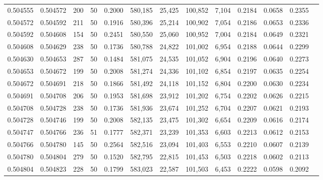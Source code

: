 \begin{tabular}{rrrrrrrrrrrrr}
0.504555 & 0.504572 & 200 &  50 &                                     0.2000 & 580,185 &  25,425 & 100,852 &   7,104 & 0.2184 & 0.0658 & 0.2355 \\
0.504572 & 0.504592 & 211 &  50 &                                     0.1916 & 580,396 &  25,214 & 100,902 &   7,054 & 0.2186 & 0.0653 & 0.2336 \\
0.504592 & 0.504608 & 154 &  50 &                                     0.2451 & 580,550 &  25,060 & 100,952 &   7,004 & 0.2184 & 0.0649 & 0.2321 \\
0.504608 & 0.504629 & 238 &  50 &                                     0.1736 & 580,788 &  24,822 & 101,002 &   6,954 & 0.2188 & 0.0644 & 0.2299 \\
0.504630 & 0.504653 & 287 &  50 &                                     0.1484 & 581,075 &  24,535 & 101,052 &   6,904 & 0.2196 & 0.0640 & 0.2273 \\
0.504653 & 0.504672 & 199 &  50 &                                     0.2008 & 581,274 &  24,336 & 101,102 &   6,854 & 0.2197 & 0.0635 & 0.2254 \\
0.504672 & 0.504691 & 218 &  50 &                                     0.1866 & 581,492 &  24,118 & 101,152 &   6,804 & 0.2200 & 0.0630 & 0.2234 \\
0.504691 & 0.504708 & 206 &  50 &                                     0.1953 & 581,698 &  23,912 & 101,202 &   6,754 & 0.2202 & 0.0626 & 0.2215 \\
0.504708 & 0.504728 & 238 &  50 &                                     0.1736 & 581,936 &  23,674 & 101,252 &   6,704 & 0.2207 & 0.0621 & 0.2193 \\
0.504728 & 0.504746 & 199 &  50 &                                     0.2008 & 582,135 &  23,475 & 101,302 &   6,654 & 0.2209 & 0.0616 & 0.2174 \\
0.504747 & 0.504766 & 236 &  51 &                                     0.1777 & 582,371 &  23,239 & 101,353 &   6,603 & 0.2213 & 0.0612 & 0.2153 \\
0.504766 & 0.504780 & 145 &  50 &                                     0.2564 & 582,516 &  23,094 & 101,403 &   6,553 & 0.2210 & 0.0607 & 0.2139 \\
0.504780 & 0.504804 & 279 &  50 &                                     0.1520 & 582,795 &  22,815 & 101,453 &   6,503 & 0.2218 & 0.0602 & 0.2113 \\
0.504804 & 0.504823 & 228 &  50 &                                     0.1799 & 583,023 &  22,587 & 101,503 &   6,453 & 0.2222 & 0.0598 & 0.2092 \\

\end{tabular}
